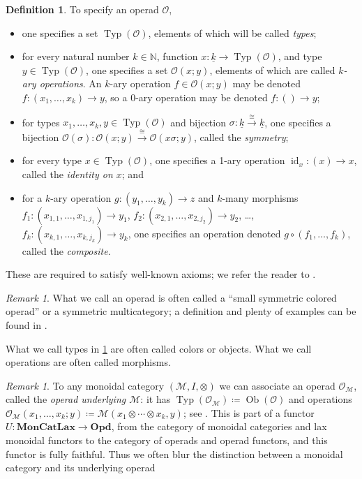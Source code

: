 \documentclass[11pt, article, oneside]{memoir}
\theoremstyle{plain}
\theoremstyle{definition}
\newtheorem{definition}[theorem]{Definition}
\theoremstyle{remark}
\newtheorem{remark}[theorem]{Remark}
\newcommand{\cat}[1]{\mathcal{#1}}
\newcommand{\Cat}[1]{\mathbf{#1}}
\DeclareMathOperator{\id}{id}
\DeclareMathOperator{\Ob}{Ob}
\DeclareMathOperator{\Typ}{Typ}
\newcommand{\NN}{\mathbb{N}}
\newcommand{\To}[1]{\xrightarrow{#1}}
\newcommand{\ul}[1]{\underline{#1}}
\newcommand{\OO}{\cat{O}}
\begin{document}
\begin{definition}\label{def.operad}
To specify an operad $\OO$,
\begin{itemize}
	\item one specifies a set $\Typ(\OO)$, elements of which will be called \emph{types};
	\item for every natural number $k\in\NN$, function $x\colon\ul{k}\to\Typ(\OO)$, and type $y\in\Typ(\OO)$, one specifies a set $\OO(x;y)$, elements of which are called \emph{$k$-ary operations}. An $k$-ary operation $f\in\OO(x;y)$ may be denoted $f\colon(x_1,\ldots,x_k)\to y$, so a $0$-ary operation may be denoted $f\colon()\to y$;
	\item for types $x_1,\ldots,x_k,y\in\Typ(\OO)$ and bijection $\sigma\colon\ul{k}\To{\cong}\ul{k}$, one specifies a bijection $\OO(\sigma)\colon\OO(x;y)\To\cong\OO(x\sigma;y)$, called the \emph{symmetry};
	\item for every type $x\in\Typ(\OO)$, one specifies a 1-ary operation $\id_x\colon(x)\to x$, called the \emph{identity on $x$}; and
	\item for a $k$-ary operation $g\colon(y_1,\ldots,y_k)\to z$ and $k$-many morphisms $f_1\colon(x_{1,1},\ldots,x_{1,j_1})\to y_1$, $f_2\colon(x_{2,1},\ldots,x_{2,j_2})\to y_2$, \ldots, $f_k\colon(x_{k,1},\ldots,x_{k,j_k})\to y_k$, one specifies an operation denoted $g\circ(f_1,\ldots,f_k)$, called the \emph{composite}.
\end{itemize}
These are required to satisfy well-known axioms; we refer the reader to \cite[Definition 2.2.21(?)]{Leinster:2004a}.
\end{definition}

\begin{remark}
What we call an operad is often called a ``small symmetric colored operad'' or a symmetric multicategory; a definition and plenty of examples can be found in \cite{Leinster:2004a}.

What we call types in \cref{def.operad} are often called colors or objects. What we call operations are often called morphisms.
\end{remark}

\begin{remark}\label{rem.mon_cat_operad_blur}
To any monoidal category $(\cat{M},I,\otimes)$ we can associate an operad $\OO_\cat{M}$, called the \emph{operad underlying $\cat{M}$}: it has $\Typ(\OO_\cat{M})\coloneqq\Ob(\cat{O})$ and operations $\OO_{\cat{M}}(x_1,\ldots,x_k;y)\coloneqq\cat{M}(x_1\otimes\cdots\otimes x_k,y)$; see \cite{Leinster:2004a}. This is part of a functor $U\colon\Cat{MonCatLax}\to\Cat{Opd}$, from the category of monoidal categories and lax monoidal functors to the category of operads and operad functors, and this functor is fully faithful. Thus we often blur the distinction between a monoidal category and its underlying operad
\end{remark}
\end{document}
